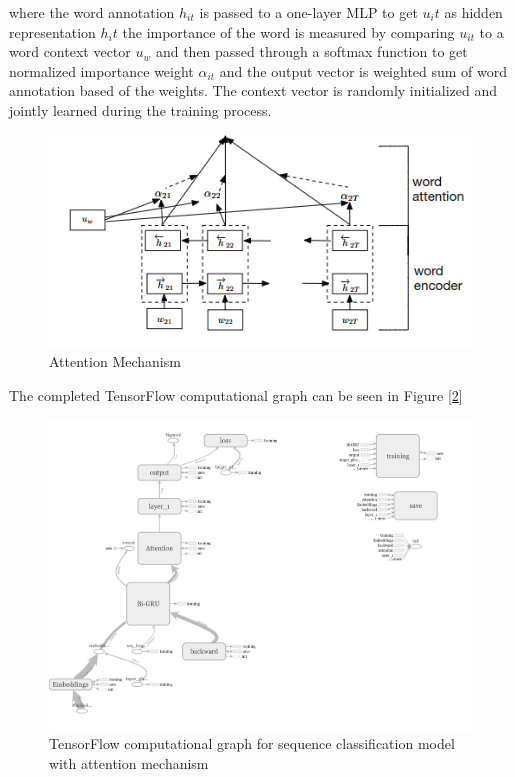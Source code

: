 \documentclass{article}
\begin{document}
    where the word annotation $h_{it}$ is passed to a one-layer MLP to get $u_it$ as hidden representation $h_it$  the importance of the word is measured by comparing $u_{it}$ to a word context vector $u_w$ and then passed through a softmax function to get normalized importance weight $\alpha_{it}$ and the output vector is weighted sum of word annotation based of the weights. The context vector is randomly initialized and jointly learned during the training process.

    \begin{figure}
        \centering
        \includegraphics[scale=0.7]{attention.png}
        \caption{Attention Mechanism \cite{yang2016hierarchical}}
        \label{fig:attention}
    \end{figure}

    The completed TensorFlow computational graph can be seen in Figure [\ref{fig:tensorflow}]

    \begin{figure}
        \centering
        \includegraphics[scale=0.3]{tensorflow.png}
        \caption{TensorFlow computational graph for sequence classification model with attention mechanism}
        \label{fig:tensorflow}
    \end{figure}
\end{document}
